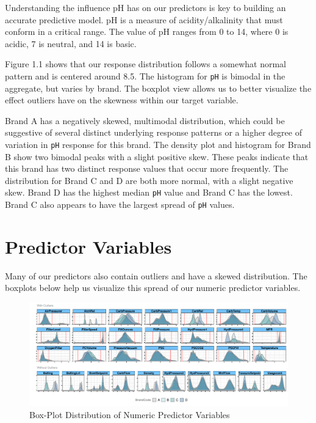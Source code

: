 \documentclass[]{report}
\begin{document}
Understanding the influence pH has on our predictors is key to building
an accurate predictive model. pH is a measure of acidity/alkalinity that
must conform in a critical range. The value of pH ranges from 0 to 14,
where 0 is acidic, 7 is neutral, and 14 is basic.

Figure 1.1 shows that our response distribution follows a somewhat
normal pattern and is centered around 8.5. The histogram for \texttt{pH}
is bimodal in the aggregate, but varies by brand. The boxplot view
allows us to better visualize the effect outliers have on the skewness
within our target variable.

Brand A has a negatively skewed, multimodal distribution, which could be
suggestive of several distinct underlying response patterns or a higher
degree of variation in \texttt{pH} response for this brand. The density
plot and histogram for Brand B show two bimodal peaks with a slight
positive skew. These peaks indicate that this brand has two distinct
response values that occur more frequently. The distribution for Brand C
and D are both more normal, with a slight negative skew. Brand D has the
highest median \texttt{pH} value and Brand C has the lowest. Brand C
also appears to have the largest spread of \texttt{pH} values.

\hypertarget{predictor-variables}{%
\section{Predictor Variables}\label{predictor-variables}}

Many of our predictors also contain outliers and have a skewed
distribution. The boxplots below help us visualize this spread of our
numeric predictor variables.

\begin{figure}
\centering
\includegraphics{Proj2-JM_files/figure-latex/unnamed-chunk-3-1.pdf}
\caption{Box-Plot Distribution of Numeric Predictor Variables}
\end{figure}
\end{document}
